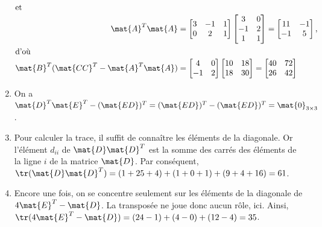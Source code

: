 \begin{exercice}
\begin{sol}
\begin{enumerate}
\begin{align*}
        \intertext{et}
        \mat{A}^T \mat{A}
        &=
        \begin{bmatrix}
          3 & -1 & 1 \\ 0 & 2 & 1
        \end{bmatrix}
        \begin{bmatrix}
          3 & 0 \\ -1 & 2 \\ 1 & 1
        \end{bmatrix} =
        \begin{bmatrix}
          11 & -1 \\ -1 & 5
        \end{bmatrix}, \\
        \intertext{d'où}
        \mat{B}^T (\mat{CC}^T - \mat{A}^T \mat{A})
        &=
        \begin{bmatrix}
          4 & 0 \\ -1 & 2
        \end{bmatrix}
        \begin{bmatrix}
          10 & 18 \\ 18 & 30
        \end{bmatrix} =
        \begin{bmatrix}
          40 & 72 \\ 26 & 42
        \end{bmatrix}
      \end{align*}
    \item On a $\mat{D}^T \mat{E}^T - (\mat{ED})^T = (\mat{ED})^T -
      (\mat{ED})^T = \mat{0}_{3 \times 3}$.
    \item Pour calculer la trace, il suffit de connaître les éléments
      de la diagonale. Or l'élément $d_{ii}$ de $\mat{D}\mat{D}^T$ est
      la somme des carrés des éléments de la ligne $i$ de la matrice
      $\mat{D}$. Par conséquent, $\tr(\mat{D}\mat{D}^T) = (1 + 25 + 4)
      + (1 + 0 + 1) + (9 + 4 + 16) = 61$.
    \item Encore une fois, on se concentre seulement sur les éléments
      de la diagonale de $4 \mat{E}^T - \mat{D}$. La transposée ne
      joue donc aucun rôle, ici. Ainsi, $\tr(4 \mat{E}^T - \mat{D}) =
      (24 - 1) + (4 - 0) + (12 - 4) = 35$.
    \end{enumerate}
  \end{sol}
  \begin{rep}
    \raggedright
\end{rep}
\end{exercice}
